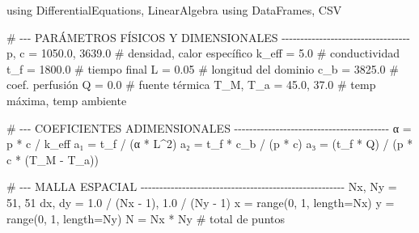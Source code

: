 \documentclass[
  spanish,
  us-letterpaper,
]{scrreprt}
\newenvironment{Shaded}{\begin{snugshade}}{\end{snugshade}}
\newcommand{\BuiltInTok}[1]{\textcolor[rgb]{0.00,0.23,0.31}{#1}}
\newcommand{\CommentTok}[1]{\textcolor[rgb]{0.37,0.37,0.37}{#1}}
\newcommand{\FloatTok}[1]{\textcolor[rgb]{0.68,0.00,0.00}{#1}}
\newcommand{\FunctionTok}[1]{\textcolor[rgb]{0.28,0.35,0.67}{#1}}
\newcommand{\ImportTok}[1]{\textcolor[rgb]{0.00,0.46,0.62}{#1}}
\newcommand{\NormalTok}[1]{\textcolor[rgb]{0.00,0.23,0.31}{#1}}
\newcommand{\OperatorTok}[1]{\textcolor[rgb]{0.37,0.37,0.37}{#1}}
\theoremstyle{plain}
\theoremstyle{definition}
\theoremstyle{remark}
\begin{document}
\begin{Shaded}
\begin{Highlighting}[]
\ImportTok{using} \BuiltInTok{DifferentialEquations}\NormalTok{, }\BuiltInTok{LinearAlgebra}
\ImportTok{using} \BuiltInTok{DataFrames}\NormalTok{, }\BuiltInTok{CSV}

\CommentTok{\# {-}{-}{-} PARÁMETROS FÍSICOS Y DIMENSIONALES {-}{-}{-}{-}{-}{-}{-}{-}{-}{-}{-}{-}{-}{-}{-}{-}{-}{-}{-}{-}{-}{-}{-}{-}{-}{-}{-}{-}{-}{-}{-}{-}{-}{-}}
\NormalTok{p, c  }\OperatorTok{=} \FloatTok{1050.0}\NormalTok{, }\FloatTok{3639.0}                       \CommentTok{\# densidad, calor específico }
\NormalTok{k\_eff }\OperatorTok{=} \FloatTok{5.0}                                  \CommentTok{\# conductividad}
\NormalTok{t\_f   }\OperatorTok{=} \FloatTok{1800.0}                               \CommentTok{\# tiempo final }
\NormalTok{L     }\OperatorTok{=} \FloatTok{0.05}                                 \CommentTok{\# longitud del dominio}
\NormalTok{c\_b   }\OperatorTok{=} \FloatTok{3825.0}                               \CommentTok{\# coef. perfusión}
\NormalTok{Q     }\OperatorTok{=} \FloatTok{0.0}                                  \CommentTok{\# fuente térmica}
\NormalTok{T\_M, T\_a }\OperatorTok{=} \FloatTok{45.0}\NormalTok{, }\FloatTok{37.0}                        \CommentTok{\# temp máxima, temp ambiente}

\CommentTok{\# {-}{-}{-} COEFICIENTES ADIMENSIONALES {-}{-}{-}{-}{-}{-}{-}{-}{-}{-}{-}{-}{-}{-}{-}{-}{-}{-}{-}{-}{-}{-}{-}{-}{-}{-}{-}{-}{-}{-}{-}{-}{-}{-}{-}{-}{-}{-}{-}{-}{-}}
\NormalTok{α }\OperatorTok{=}\NormalTok{ p }\OperatorTok{*}\NormalTok{ c }\OperatorTok{/}\NormalTok{ k\_eff}
\NormalTok{a₁ }\OperatorTok{=}\NormalTok{ t\_f }\OperatorTok{/}\NormalTok{ (α }\OperatorTok{*}\NormalTok{ L}\OperatorTok{\^{}}\FloatTok{2}\NormalTok{)}
\NormalTok{a₂ }\OperatorTok{=}\NormalTok{ t\_f }\OperatorTok{*}\NormalTok{ c\_b }\OperatorTok{/}\NormalTok{ (p }\OperatorTok{*}\NormalTok{ c)}
\NormalTok{a₃ }\OperatorTok{=}\NormalTok{ (t\_f }\OperatorTok{*}\NormalTok{ Q) }\OperatorTok{/}\NormalTok{ (p }\OperatorTok{*}\NormalTok{ c }\OperatorTok{*}\NormalTok{ (T\_M }\OperatorTok{{-}}\NormalTok{ T\_a))}

\CommentTok{\# {-}{-}{-} MALLA ESPACIAL {-}{-}{-}{-}{-}{-}{-}{-}{-}{-}{-}{-}{-}{-}{-}{-}{-}{-}{-}{-}{-}{-}{-}{-}{-}{-}{-}{-}{-}{-}{-}{-}{-}{-}{-}{-}{-}{-}{-}{-}{-}{-}{-}{-}{-}{-}{-}{-}{-}{-}{-}{-}{-}{-}}
\NormalTok{Nx, Ny }\OperatorTok{=} \FloatTok{51}\NormalTok{, }\FloatTok{51}
\NormalTok{dx, dy }\OperatorTok{=} \FloatTok{1.0} \OperatorTok{/}\NormalTok{ (Nx }\OperatorTok{{-}} \FloatTok{1}\NormalTok{), }\FloatTok{1.0} \OperatorTok{/}\NormalTok{ (Ny }\OperatorTok{{-}} \FloatTok{1}\NormalTok{)}
\NormalTok{x }\OperatorTok{=} \FunctionTok{range}\NormalTok{(}\FloatTok{0}\NormalTok{, }\FloatTok{1}\NormalTok{, length}\OperatorTok{=}\NormalTok{Nx)}
\NormalTok{y }\OperatorTok{=} \FunctionTok{range}\NormalTok{(}\FloatTok{0}\NormalTok{, }\FloatTok{1}\NormalTok{, length}\OperatorTok{=}\NormalTok{Ny)}
\NormalTok{N }\OperatorTok{=}\NormalTok{ Nx }\OperatorTok{*}\NormalTok{ Ny  }\CommentTok{\# total de puntos}


\end{Highlighting}
\end{Shaded}
\end{document}
